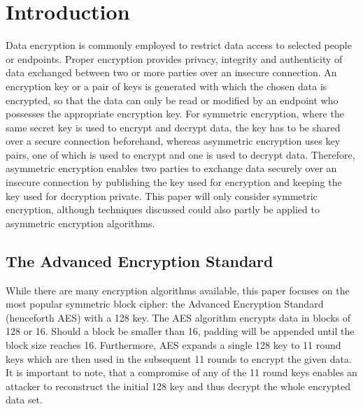 \documentclass[journal]{IEEEtran}
\begin{document}
\section{Introduction}
Data encryption is commonly employed to restrict data access to selected people or endpoints. Proper encryption provides privacy, integrity and authenticity of data exchanged between two or more parties over an insecure connection. An encryption key or a pair of keys is generated with which the chosen data is encrypted, so that the data can only be read or modified by an endpoint who possesses the appropriate encryption key. For symmetric encryption, where the same secret key is used to encrypt and decrypt data, the key has to be shared over a secure connection beforehand, whereas asymmetric encryption uses key pairs, one of which is used to encrypt and one is used to decrypt data. Therefore, asymmetric encryption enables two parties to exchange data securely over an insecure connection by publishing the key used for encryption and keeping the key used for decryption private. This paper will only consider symmetric encryption, although techniques discussed could also partly be applied to asymmetric encryption algorithms.

\subsection{The Advanced Encryption Standard}
While there are many encryption algorithms available, this paper focuses on the most popular symmetric block cipher: the Advanced Encryption Standard (henceforth AES) with a \SI{128}{\bit} key. The AES algorithm encrypts data in blocks of \SI{128}{\bit} or \SI{16}{\byte}. Should a block be smaller than \SI{16}{\byte}, padding will be appended until the block size reaches \SI{16}{\byte}. Furthermore, AES expands a single \SI{128}{\bit} key to 11 round keys which are then used in the subsequent 11 rounds to encrypt the given data. It is important to note, that a compromise of any of the 11 round keys enables an attacker to reconstruct the initial \SI{128}{\bit} key and thus decrypt the whole encrypted data set. 
\end{document}
